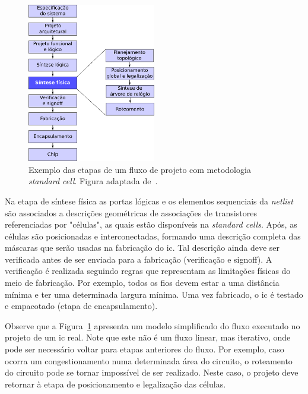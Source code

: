 \begin{figure}[]
    \centering
    \includegraphics[width=0.5\textwidth]{img/introducao/exemplo_fluxo.pdf}
    \caption[Etapas do fluxo \textit{standard cell}.]{Exemplo das etapas de um fluxo de projeto com metodologia \textit{standard cell}. Figura adaptada de~.}
    \label{fig:exemplo_fluxo}
\end{figure}

Na etapa de síntese física as portas lógicas e os elementos sequenciais da \textit{netlist} são associados a descrições geométricas de associações de transistores referenciadas por "células", as quais estão disponíveis na \textit{standard cells}.
Após, as células são posicionadas e interconectadas, formando uma descrição completa das máscaras que serão usadas na fabricação do \ac{ic}.
Tal descrição ainda deve ser verificada antes de ser enviada para a fabricação (verificação e signoff).
A verificação é realizada seguindo regras que representam as limitações físicas do meio de fabricação.
Por exemplo, todos os fios devem estar a uma distância mínima e ter uma determinada largura mínima.
Uma vez fabricado, o \ac{ic} é testado e empacotado (etapa de encapsulamento).

Observe que a Figura~\ref{fig:exemplo_fluxo} apresenta um modelo simplificado do fluxo executado no projeto de um \ac{ic} real.
Note que este não é um fluxo linear, mas iterativo, onde pode ser necessário voltar para etapas anteriores do fluxo.
Por exemplo, caso ocorra um congestionamento numa determinada área do circuito, o roteamento do circuito pode se tornar impossível de ser realizado. Neste caso, o projeto deve retornar à etapa de posicionamento e legalização das células.

